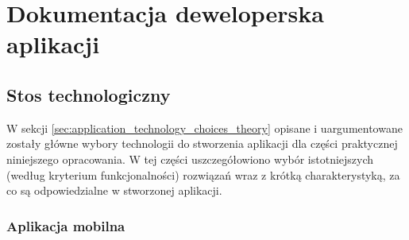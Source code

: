 \documentclass[../main.tex]{subfiles}
\begin{document}
\chapter{Dokumentacja deweloperska aplikacji}

\section{Stos technologiczny}
W sekcji \ref{sec:application_technology_choices_theory} opisane i uargumentowane zostały główne wybory technologii do stworzenia aplikacji dla części praktycznej niniejszego opracowania. W tej części uszczegółowiono wybór istotniejszych (według kryterium funkcjonalności) rozwiązań wraz z krótką charakterystyką, za co są odpowiedzialne w stworzonej aplikacji.

\subsection{Aplikacja mobilna}
\end{document}
